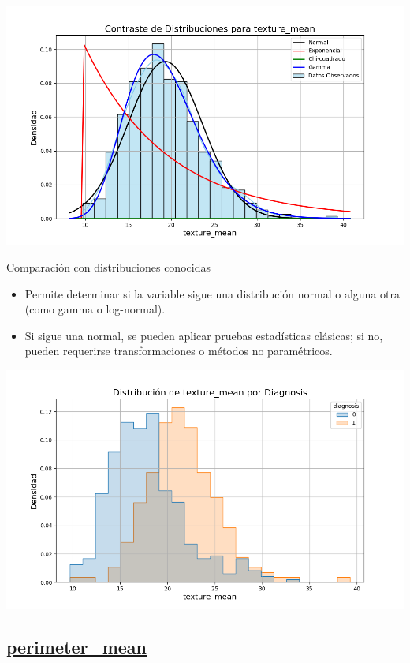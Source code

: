 \documentclass[a4paper, 12pt]{article}
\begin{document}
\includegraphics[width=\textwidth]{../Plots/plots_stats/texture_mean/distribuciones_conocidas_texture_mean.png}

Comparación con distribuciones conocidas

\begin{itemize}
\item Permite determinar si la variable sigue una distribución normal o alguna otra (como gamma o log-normal).
\item Si sigue una normal, se pueden aplicar pruebas estadísticas clásicas; si no, pueden requerirse transformaciones o métodos no paramétricos.
\end{itemize}

\includegraphics[width=\textwidth]{../Plots/plots_diagnosis/distribucion_texture_mean_por_diagnosis.png}

\subsection*{\underline{perimeter\_mean}}
\end{document}
